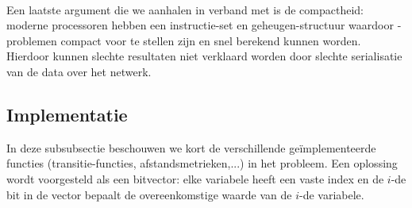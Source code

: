 \paragraph{}
Een laatste argument die we aanhalen in verband met  is de compactheid: moderne processoren hebben een instructie-set en geheugen-structuur waardoor -problemen compact voor te stellen zijn en snel berekend kunnen worden. Hierdoor kunnen slechte resultaten niet verklaard worden door slechte serialisatie van de data over het netwerk.

\subsection{Implementatie}

In deze subsubsectie beschouwen we kort de verschillende ge\"implementeerde functies (transitie-functies, afstandsmetrieken,...) in het  probleem. Een oplossing wordt voorgesteld als een bitvector: elke variabele heeft een vaste index en de $i$-de bit in de vector bepaalt de overeenkomstige waarde van de $i$-de variabele.

